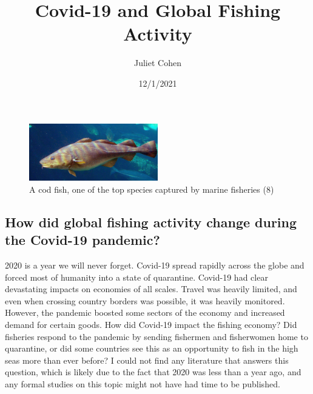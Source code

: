 \documentclass[
]{article}
\title{Covid-19 and Global Fishing Activity}
\author{Juliet Cohen}
\date{12/1/2021}
\begin{document}
\maketitle

\begin{figure}
\centering
\includegraphics[width=0.5\textwidth,height=\textheight]{pictures/cod.png}
\caption{A cod fish, one of the top species captured by marine fisheries
(8)}
\end{figure}

\hypertarget{how-did-global-fishing-activity-change-during-the-covid-19-pandemic}{%
\subsection{How did global fishing activity change during the Covid-19
pandemic?}\label{how-did-global-fishing-activity-change-during-the-covid-19-pandemic}}

2020 is a year we will never forget. Covid-19 spread rapidly across the
globe and forced most of humanity into a state of quarantine. Covid-19
had clear devastating impacts on economies of all scales. Travel was
heavily limited, and even when crossing country borders was possible, it
was heavily monitored. However, the pandemic boosted some sectors of the
economy and increased demand for certain goods. How did Covid-19 impact
the fishing economy? Did fisheries respond to the pandemic by sending
fishermen and fisherwomen home to quarantine, or did some countries see
this as an opportunity to fish in the high seas more than ever before? I
could not find any literature that answers this question, which is
likely due to the fact that 2020 was less than a year ago, and any
formal studies on this topic might not have had time to be published.
\end{document}
